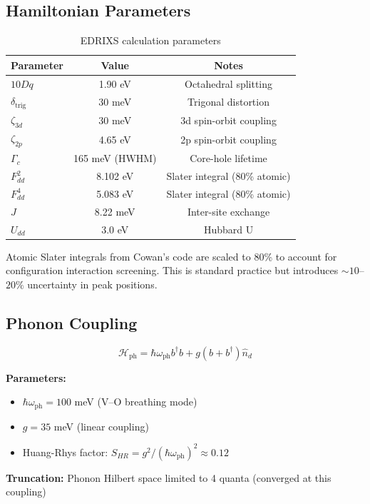\documentclass[11pt,letterpaper]{article}
\begin{document}
\subsection{Hamiltonian Parameters}

\begin{table}[h]
\centering
\begin{tabular}{lcc}
\toprule
Parameter & Value & Notes \\
\midrule
$10Dq$ & 1.90 eV & Octahedral splitting \\
$\delta_{\text{trig}}$ & 30 meV & Trigonal distortion \\
$\zeta_{3d}$ & 30 meV & 3d spin-orbit coupling \\
$\zeta_{2p}$ & 4.65 eV & 2p spin-orbit coupling \\
$\Gamma_c$ & 165 meV (HWHM) & Core-hole lifetime \\
$F^2_{dd}$ & 8.102 eV & Slater integral (80\% atomic) \\
$F^4_{dd}$ & 5.083 eV & Slater integral (80\% atomic) \\
$J$ & 8.22 meV & Inter-site exchange \\
$U_{dd}$ & 3.0 eV & Hubbard U \\
\bottomrule
\end{tabular}
\caption{EDRIXS calculation parameters}
\end{table}

\begin{assumption}[title={Slater Integral Scaling}]
Atomic Slater integrals from Cowan's code are scaled to 80\% to account for configuration interaction screening. This is standard practice but introduces $\sim 10$--$20\%$ uncertainty in peak positions.
\end{assumption}

\subsection{Phonon Coupling}

\begin{derivation}[title={Displaced Oscillator Model}]
\begin{equation}
\mathcal{H}_{\text{ph}} = \hbar\omega_{\text{ph}} b^\dagger b + g(b + b^\dagger) \hat{n}_d
\end{equation}

\textbf{Parameters:}
\begin{itemize}
    \item $\hbar\omega_{\text{ph}} = 100$ meV (V--O breathing mode)
    \item $g = 35$ meV (linear coupling)
    \item Huang-Rhys factor: $S_{HR} = g^2/(\hbar\omega_{\text{ph}})^2 \approx 0.12$
\end{itemize}

\textbf{Truncation:} Phonon Hilbert space limited to 4 quanta (converged at this coupling)
\end{derivation}
\end{document}
